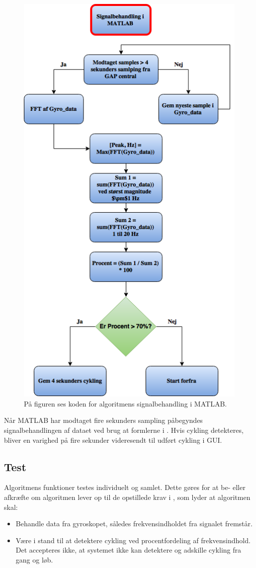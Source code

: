 \begin{figure}[H]
	\centering
	\includegraphics[scale=0.4]{figures/cDesign/algoritme_matlab_cykling.png}
	\caption{På figuren ses koden for algoritmens signalbehandling i MATLAB.}
	\label{fig:matlab_cykling}
\end{figure} 
Når MATLAB har modtaget fire sekunders sampling påbegyndes signalbehandlingen af dataet ved brug at formlerne i . Hvis cykling detekteres, bliver en varighed på fire sekunder videresendt til udført cykling i GUI. 

\subsection{Test}
Algoritmens funktioner testes individuelt og samlet. Dette gøres for at be- eller afkræfte om algoritmen lever op til de opstillede krav i , som lyder at algoritmen skal:
\begin{itemize}
	\item Behandle data fra gyroskopet, således frekvensindholdet fra signalet fremstår.
	\item Være i stand til at detektere cykling ved procentfordeling af frekvensindhold. Det accepteres ikke, at systemet ikke kan detektere og adskille cykling fra gang og løb.
\end{itemize}

